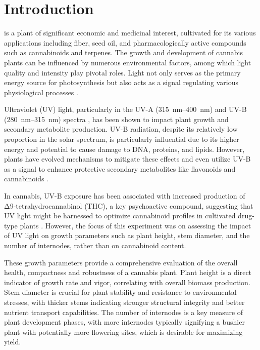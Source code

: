 \section{Introduction}

 is a plant of significant economic and medicinal interest, cultivated for its various applications including fiber, seed oil, and pharmacologically active compounds such as cannabinoids and terpenes. The growth and development of cannabis plants can be influenced by numerous environmental factors, among which light quality and intensity play pivotal roles. Light not only serves as the primary energy source for photosynthesis but also acts as a signal regulating various physiological processes \autocite{eichhorn_bilodeau_update_2019}.

Ultraviolet (UV) light, particularly in the UV-A (\qtyrange[mode=text, range-phrase=\textendash, range-units=single]{315}{400}{\nm}) and UV-B (\qtyrange[mode=text, range-phrase=\textendash, range-units=single]{280}{315}{\nm}) spectra \autocite{international_organization_for_standardization_space_2007}, has been shown to impact plant growth and secondary metabolite production. UV-B radiation, despite its relatively low proportion in the solar spectrum, is particularly influential due to its higher energy and potential to cause damage to DNA, proteins, and lipids. However, plants have evolved mechanisms to mitigate these effects and even utilize UV-B as a signal to enhance protective secondary metabolites like flavonoids and cannabinoids \autocite{eichhorn_bilodeau_update_2019}.

In cannabis, UV-B exposure has been associated with increased production of Δ9-tetrahydrocannabinol (THC), a key psychoactive compound, suggesting that UV light might be harnessed to optimize cannabinoid profiles in cultivated drug-type plants \autocite{eichhorn_bilodeau_update_2019, lydon_uv-b_1987}. However, the focus of this experiment was on assessing the impact of UV light on growth parameters such as plant height, stem diameter, and the number of internodes, rather than on cannabinoid content.

These growth parameters provide a comprehensive evaluation of the overall health, compactness and robustness of a cannabis plant. Plant height is a direct indicator of growth rate and vigor, correlating with overall biomass production. Stem diameter is crucial for plant stability and resistance to environmental stresses, with thicker stems indicating stronger structural integrity and better nutrient transport capabilities. The number of internodes is a key measure of plant development phases, with more internodes typically signifying a bushier plant with potentially more flowering sites, which is desirable for maximizing yield.

